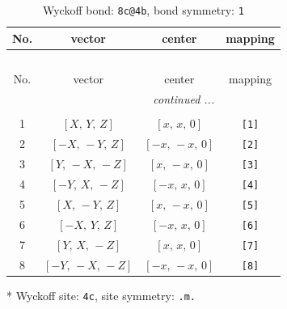 \documentclass[fleqn,8pt]{jsarticle}
\begin{document}
\renewcommand{\arraystretch}{1.2}
\begin{longtable}{cccc}
\caption{Wyckoff bond: {\tt 8c@4b}, bond symmetry: {\tt 1}}
 \\
 \hline \hline
No. & vector & center & mapping \\ \hline \endfirsthead

\multicolumn{3}{l}{\tablename\ \thetable{}} \\
 \hline \hline
No. & vector & center & mapping \\ \hline \endhead

 \hline \hline
\multicolumn{3}{r}{\footnotesize\it continued ...} \\ \endfoot

 \hline \hline
\multicolumn{3}{r}{} \\ \endlastfoot

1 & $\left[ X,\, Y,\, Z \right]$ & $\left[ x,\, x,\, 0 \right]$ & {\tt [1]} \\ \hline
2 & $\left[ - X,\, - Y,\, Z \right]$ & $\left[ - x,\, - x,\, 0 \right]$ & {\tt [2]} \\ \hline
3 & $\left[ Y,\, - X,\, - Z \right]$ & $\left[ x,\, - x,\, 0 \right]$ & {\tt [3]} \\ \hline
4 & $\left[ - Y,\, X,\, - Z \right]$ & $\left[ - x,\, x,\, 0 \right]$ & {\tt [4]} \\ \hline
5 & $\left[ X,\, - Y,\, Z \right]$ & $\left[ x,\, - x,\, 0 \right]$ & {\tt [5]} \\ \hline
6 & $\left[ - X,\, Y,\, Z \right]$ & $\left[ - x,\, x,\, 0 \right]$ & {\tt [6]} \\ \hline
7 & $\left[ Y,\, X,\, - Z \right]$ & $\left[ x,\, x,\, 0 \right]$ & {\tt [7]} \\ \hline
8 & $\left[ - Y,\, - X,\, - Z \right]$ & $\left[ - x,\, - x,\, 0 \right]$ & {\tt [8]} \\
\end{longtable}
* Wyckoff site: {\tt 4c}, site symmetry: {\tt .m.}
\renewcommand{\arraystretch}{1.2}
\end{document}

